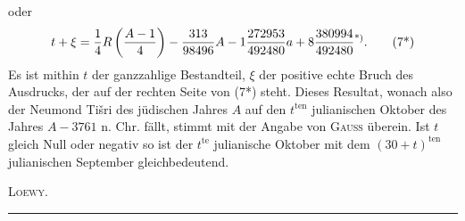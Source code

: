 \noindent oder
\begin{equation}
t+\xi=\frac{1}{4}R\left(\frac{A-1}{4}\right)-\frac{313}{98496}A-1\frac{272953}{492480}a+8\frac{380994}{492480}\text{\textsuperscript{*)}}.\tag*{(7*)}
\end{equation}
\begingroup\renewcommand{\thefootnote}{}\endgroup
\noindent Es ist mithin $t$ der ganzzahlige Bestandteil, $\xi$ der positive echte Bruch des Ausdrucks, der auf der rechten Seite von (7*) steht. Dieses Resultat, wonach also der Neumond Tišri des jüdischen Jahres $A$ auf den $t^{\mathrm{ten}}$ julianischen Oktober des Jahres $A-3761$ n. Chr. fällt, stimmt mit der Angabe von \textsc{Gauss} überein. Ist $t$ gleich Null oder negativ so ist der $t^{\mathrm{te}}$ julianische Oktober mit dem $(30+t)^{\mathrm{ten}}$ julianischen September gleichbedeutend.
\begin{flushright}\textsc{Loewy.}\end{flushright}
{\normalsize \begin{center}\rule{.25\textwidth}{.35pt}\end{center}}
\clearpage\endgroup\endgroup
